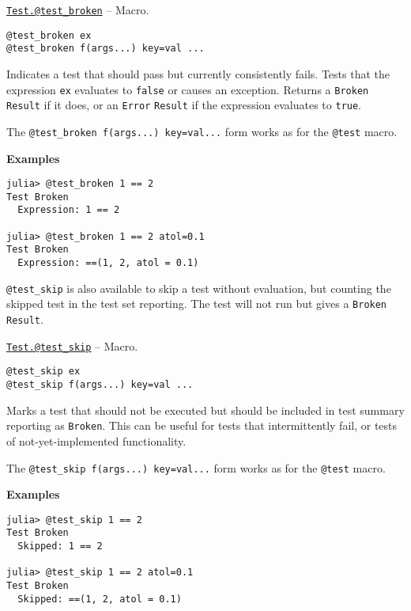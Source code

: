 \hypertarget{5668051953647432783}{}
\hyperlink{5668051953647432783}{\texttt{Test.@test\_broken}}  -- {Macro.}

\begin{adjustwidth}{2em}{0pt}


\begin{verbatim}
@test_broken ex
@test_broken f(args...) key=val ...
\end{verbatim}

Indicates a test that should pass but currently consistently fails. Tests that the expression \texttt{ex} evaluates to \texttt{false} or causes an exception. Returns a \texttt{Broken} \texttt{Result} if it does, or an \texttt{Error} \texttt{Result} if the expression evaluates to \texttt{true}.

The \texttt{@test\_broken f(args...) key=val...} form works as for the \texttt{@test} macro.

\textbf{Examples}


\begin{verbatim}
julia> @test_broken 1 == 2
Test Broken
  Expression: 1 == 2

julia> @test_broken 1 == 2 atol=0.1
Test Broken
  Expression: ==(1, 2, atol = 0.1)
\end{verbatim}



\end{adjustwidth}

\texttt{@test\_skip} is also available to skip a test without evaluation, but counting the skipped test in the test set reporting. The test will not run but gives a \texttt{Broken} \texttt{Result}.


\hypertarget{612751920735042674}{}
\hyperlink{612751920735042674}{\texttt{Test.@test\_skip}}  -- {Macro.}

\begin{adjustwidth}{2em}{0pt}


\begin{verbatim}
@test_skip ex
@test_skip f(args...) key=val ...
\end{verbatim}

Marks a test that should not be executed but should be included in test summary reporting as \texttt{Broken}. This can be useful for tests that intermittently fail, or tests of not-yet-implemented functionality.

The \texttt{@test\_skip f(args...) key=val...} form works as for the \texttt{@test} macro.

\textbf{Examples}


\begin{verbatim}
julia> @test_skip 1 == 2
Test Broken
  Skipped: 1 == 2

julia> @test_skip 1 == 2 atol=0.1
Test Broken
  Skipped: ==(1, 2, atol = 0.1)
\end{verbatim}



\end{adjustwidth}

